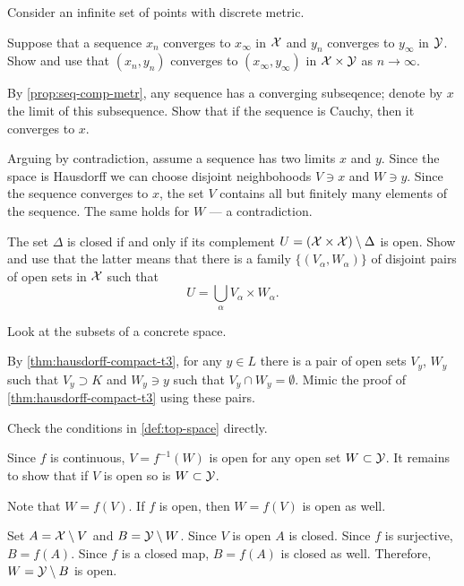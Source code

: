 \begin{multicols}{2}
Consider an infinite set of points with discrete metric.

Suppose that a sequence $x_n$ converges to $x_\infty$ in $\mathcal{X}$ 
and $y_n$ converges to $y_\infty$ in $\mathcal{Y}$.
Show and use that $(x_n,y_n)$ converges to $(x_\infty,y_\infty)$ in $\mathcal{X}\times\mathcal{Y}$ as $n\to\infty$.

By \ref{prop:seq-comp-metr}, any sequence has a converging subseqence;
denote by $x$ the limit of this subsequence.
Show that if the sequence is Cauchy, then it converges to $x$.

 Arguing by contradiction, assume a sequence has two limits $x$ and $y$.
Since the space is Hausdorff we can choose disjoint neighbohoods $V\ni x$ and $W\ni y$.
Since the sequence converges to $x$, the set $V$ contains all but finitely many elements of the sequence.
The same holds for $W$ --- a contradiction.

The set $\Delta$ is closed if and only if its complement $U=(\mathcal{X}\times\mathcal{X})\setminus\Delta$ is open.
Show and use that the latter means that there is a family $\{(V_\alpha,W_\alpha)\}$ of disjoint pairs of open sets in $\mathcal{X}$ such that
\[U=\bigcup_\alpha V_\alpha\times W_\alpha.\]

Look at the subsets of a concrete space.

 By \ref{thm:hausdorff-compact-t3}, for any $y\in L$ there is a pair of open sets $V_y$, $W_y$ such that $V_y\supset K$ and $W_y\ni y$
such that $V_y\cap W_y=\emptyset$.
Mimic the proof of \ref{thm:hausdorff-compact-t3} using these pairs.

 Check the conditions in \ref{def:top-space} directly.



Since $f$ is continuous, $V=f^{-1}(W)$ is open for any open set $W\subset \mathcal{Y}$.
It remains to show that if $V$ is open so is $W\subset \mathcal{Y}$.

Note that $W=f(V)$.
If $f$ is open, then $W=f(V)$ is open as well.

Set $A=\mathcal{X}\setminus V$ and $B=\mathcal{Y}\setminus W$.
Since $V$ is open $A$ is closed.
Since $f$ is surjective, $B=f(A)$.
Since $f$ is a closed map, $B=f(A)$ is closed as well.
Therefore, $W=\mathcal{Y}\setminus B$ is open.


\end{multicols}
